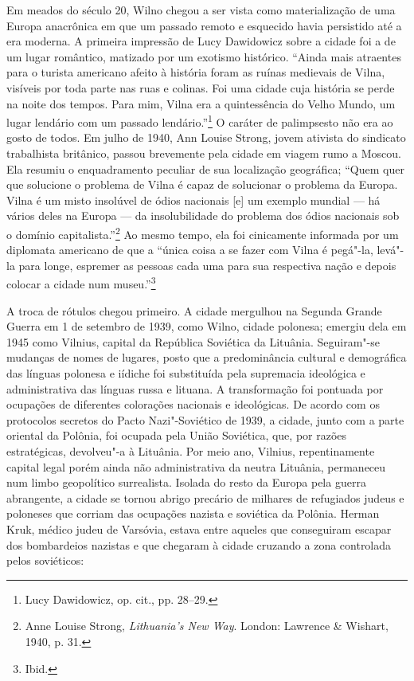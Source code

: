 %

Em meados do século 20, Wilno chegou a ser vista como materialização de
uma Europa anacrônica em que um passado remoto e esquecido havia
persistido até a era moderna. A primeira impressão de Lucy Dawidowicz
sobre a cidade foi a de um lugar romântico, matizado por um exotismo
histórico. ``Ainda mais atraentes para o turista americano afeito à
história foram as ruínas medievais de Vilna, visíveis por toda parte nas
ruas e colinas. Foi uma cidade cuja história se perde na noite dos
tempos. Para mim, Vilna era a quintessência do Velho Mundo, um lugar
lendário com um passado lendário.''\footnote{Lucy Dawidowicz, op. cit.,
  pp. 28--29.} O caráter de palimpsesto não era ao gosto de todos. Em
julho de 1940, Ann Louise Strong, jovem ativista do sindicato
trabalhista britânico, passou brevemente pela cidade em viagem rumo a
Moscou. Ela resumiu o enquadramento peculiar de sua localização
geográfica; ``Quem quer que solucione o problema de Vilna é capaz de
solucionar o problema da Europa. Vilna é um misto insolúvel de ódios
nacionais {[}e{]} um exemplo mundial --- há vários deles na Europa --- da
insolubilidade do problema dos ódios nacionais sob o domínio
capitalista.''\footnote{Anne Louise Strong, \emph{Lithuania's New Way}.
  London: Lawrence \& Wishart, 1940, p. 31.} Ao mesmo tempo, ela foi
cinicamente informada por um diplomata americano de que a ``única coisa
a se fazer com Vilna é pegá"-la, levá"-la para longe, espremer as pessoas
cada uma para sua respectiva nação e depois colocar a cidade num
museu.''\footnote{Ibid.}

A troca de rótulos chegou primeiro. A cidade mergulhou na Segunda Grande
Guerra em 1 de setembro de 1939, como Wilno, cidade polonesa; emergiu
dela em 1945 como Vilnius, capital da República Soviética da Lituânia.
Seguiram"-se mudanças de nomes de lugares, posto que a predominância
cultural e demográfica das línguas polonesa e iídiche foi substituída
pela supremacia ideológica e administrativa das línguas russa e lituana.
A transformação foi pontuada por ocupações de diferentes colorações
nacionais e ideológicas. De acordo com os protocolos secretos do Pacto
Nazi"-Soviético de 1939, a cidade, junto com a parte oriental da Polônia,
foi ocupada pela União Soviética, que, por razões estratégicas,
devolveu"-a à Lituânia. Por meio ano, Vilnius, repentinamente capital
legal porém ainda não administrativa da neutra Lituânia, permaneceu num
limbo geopolítico surrealista. Isolada do resto da Europa pela guerra
abrangente, a cidade se tornou abrigo precário de milhares de refugiados
judeus e poloneses que corriam das ocupações nazista e soviética da
Polônia. Herman Kruk, médico judeu de Varsóvia, estava entre aqueles que
conseguiram escapar dos bombardeios nazistas e que chegaram à cidade
cruzando a zona controlada pelos soviéticos:

